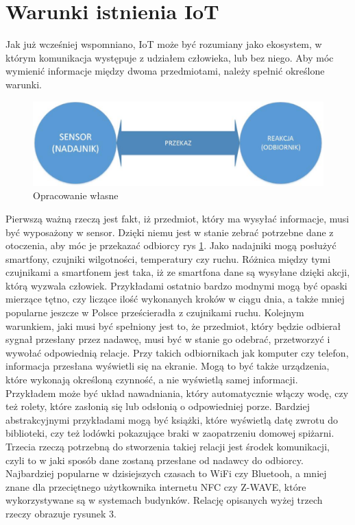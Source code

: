 \documentclass[brudnopis]{xmgr}
\begin{document}
\section{Warunki istnienia IoT}

Jak już wcześniej wspomniano, IoT może być rozumiany jako ekosystem, w którym komunikacja występuje z udziałem człowieka, lub bez niego. Aby móc wymienić informacje między dwoma przedmiotami, należy spełnić określone warunki.
\begin{figure}[h]
\centering
\includegraphics[width=12cm]{o}
\caption{Opracowanie własne}
\label{fig:opracowanie}
\end{figure} 
Pierwszą ważną rzeczą jest fakt, iż przedmiot, który ma wysyłać informacje, musi być wyposażony w sensor. Dzięki niemu jest w stanie zebrać potrzebne dane z otoczenia, aby móc je przekazać odbiorcy rys \ref{fig:opracowanie}. Jako nadajniki mogą posłużyć smartfony, czujniki wilgotności, temperatury czy ruchu. Różnica między tymi czujnikami a smartfonem jest taka, iż ze smartfona dane są wysyłane dzięki akcji, którą wyzwala człowiek. Przykładami ostatnio bardzo modnymi mogą być opaski mierzące tętno, czy liczące ilość wykonanych kroków w ciągu dnia, a także mniej popularne jeszcze w Polsce prześcieradła z czujnikami ruchu. 
Kolejnym warunkiem, jaki musi być spełniony jest to, że przedmiot, który będzie odbierał sygnał przesłany przez nadawcę, musi być w stanie go odebrać, przetworzyć i wywołać odpowiednią relacje. Przy takich odbiornikach jak komputer czy telefon, informacja przesłana wyświetli się na ekranie. Mogą to być także urządzenia, które wykonają określoną czynność, a nie wyświetlą samej informacji. Przykładem może być układ nawadniania, który automatycznie włączy wodę, czy też rolety, które zasłonią się lub odsłonią o odpowiedniej porze. Bardziej abstrakcyjnymi przykładami mogą być książki, które wyświetlą datę zwrotu do biblioteki, czy też lodówki pokazujące braki w zaopatrzeniu domowej spiżarni.  
Trzecia rzeczą potrzebną do stworzenia takiej relacji jest środek komunikacji, czyli to w jaki sposób dane zostaną przesłane od nadawcy do odbiorcy. Najbardziej popularne w dzisiejszych czasach to WiFi czy Bluetooh, a mniej znane dla przeciętnego użytkownika internetu NFC czy Z-WAVE, które wykorzystywane są w systemach budynków. 
Relację opisanych wyżej trzech rzeczy obrazuje rysunek 3.
\end{document}
